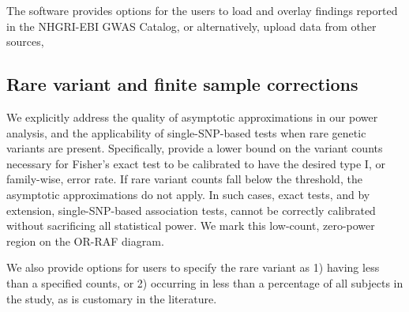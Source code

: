 The software provides options for the users to load and overlay findings reported in the NHGRI-EBI GWAS Catalog, or alternatively, upload data from other sources, 



\vspace{-5pt}
\subsection{Rare variant and finite sample corrections}

We explicitly address the quality of asymptotic approximations in our power analysis, and the applicability of single-SNP-based tests when rare genetic variants are present.
Specifically, provide a lower bound on the variant counts necessary for Fisher's exact test to be calibrated to have the desired type I, or family-wise, error rate. 
If rare variant counts fall below the threshold, the asymptotic approximations do not apply.
In such cases, exact tests, and by extension, single-SNP-based association tests, cannot be correctly calibrated without sacrificing all statistical power.
We mark this low-count, zero-power region on the OR-RAF diagram.

We also provide options for users to specify the rare variant as 1) having less than a specified counts, or 2) occurring in less than a percentage of all subjects in the study, as is customary in the literature.



